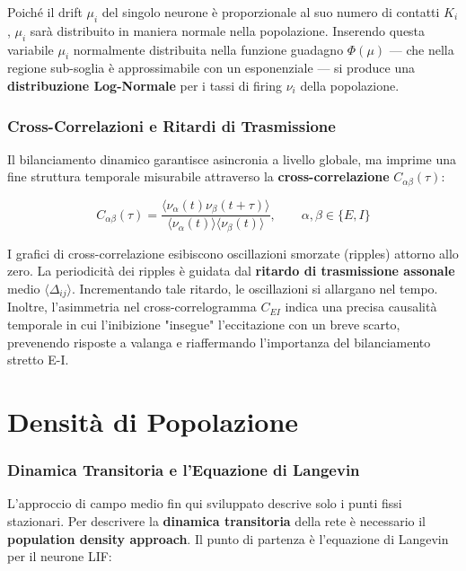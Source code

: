 Poiché il drift $\mu_i$ del singolo neurone è proporzionale al suo numero di contatti $K_i$, $\mu_i$ sarà distribuito in maniera normale nella popolazione. Inserendo questa variabile $\mu_i$ normalmente distribuita nella funzione guadagno $\Phi(\mu)$ — che nella regione sub-soglia è approssimabile con un esponenziale — si produce una \textbf{distribuzione Log-Normale} per i tassi di firing $\nu_i$ della popolazione.

\subsubsection{Cross-Correlazioni e Ritardi di Trasmissione}

Il bilanciamento dinamico garantisce asincronia a livello globale, ma imprime una fine struttura temporale misurabile attraverso la \textbf{cross-correlazione} $C_{\alpha\beta}(\tau)$:

\begin{equation}
C_{\alpha\beta}(\tau) = \frac{\langle \nu_\alpha(t) \nu_\beta(t+\tau) \rangle}{\langle \nu_\alpha(t) \rangle \langle \nu_\beta(t) \rangle}, \qquad \alpha, \beta \in \{E, I\}
\end{equation}

I grafici di cross-correlazione esibiscono oscillazioni smorzate (ripples) attorno allo zero. La periodicità dei ripples è guidata dal \textbf{ritardo di trasmissione assonale} medio $\langle \Delta_{ij} \rangle$. Incrementando tale ritardo, le oscillazioni si allargano nel tempo.
Inoltre, l'asimmetria nel cross-correlogramma $C_{EI}$ indica una precisa causalità temporale in cui l'inibizione "insegue" l'eccitazione con un breve scarto, prevenendo risposte a valanga e riaffermando l'importanza del bilanciamento stretto E-I.

\newpage

\section{Densità di Popolazione}

\subsubsection{Dinamica Transitoria e l'Equazione di Langevin}

L'approccio di campo medio fin qui sviluppato descrive solo i punti fissi stazionari. Per descrivere la \textbf{dinamica transitoria} della rete è necessario il \textbf{population density approach}.
Il punto di partenza è l'equazione di Langevin per il neurone LIF:

